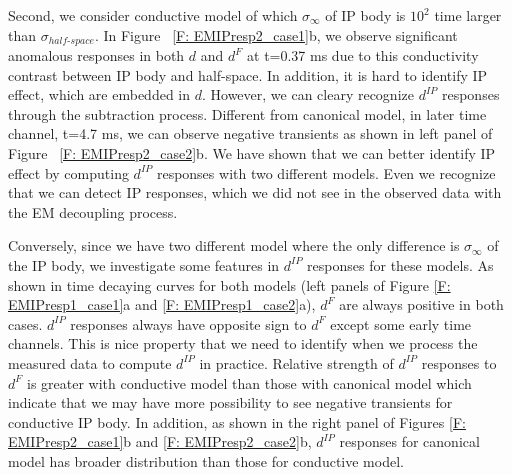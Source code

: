 \documentclass[a4paper, 11pt]{article}
\newcommand{\siginf}{\sigma_\infty}
\begin{document}
Second, we consider conductive model of which $\siginf$ of IP body is $10^2$ time larger than $\sigma_{half\text{-}space}$. In Figure ~\ref{F: EMIPresp2_case1}b, we observe significant anomalous responses in both $d$ and $d^{F}$ at t=0.37 ms due to this conductivity contrast between IP body and half-space. In addition, it is hard to identify IP effect, which are embedded in $d$. However, we can cleary recognize $d^{IP}$ responses through the subtraction process. Different from canonical model, in later time channel, t=4.7 ms, we can observe negative transients as shown in left panel of Figure ~\ref{F: EMIPresp2_case2}b. We have shown that we can better identify IP effect by computing $d^{IP}$ responses with two different models. Even we recognize that we can detect IP responses, which we did not see in the observed data with the EM decoupling process.

Conversely, since we have two different model where the only difference is $\siginf$ of the IP body, we investigate some features in $d^{IP}$ responses for these models. As shown in time decaying curves for both models (left panels of Figure \ref{F: EMIPresp1_case1}a and \ref{F: EMIPresp1_case2}a), $d^F$ are always positive in both cases. $d^{IP}$ responses always have opposite sign to $d^F$ except some early time channels. This is nice property that we need to identify when we process the measured data to compute $d^{IP}$ in practice. Relative strength of $d^{IP}$ responses to $d^F$ is greater with conductive model than those with canonical model which indicate that we may have more possibility to see negative transients for conductive IP body. In addition, as shown in the right panel of Figures \ref{F: EMIPresp2_case1}b and \ref{F: EMIPresp2_case2}b, $d^{IP}$ responses for canonical model has broader distribution than those for conductive model.
\end{document}
